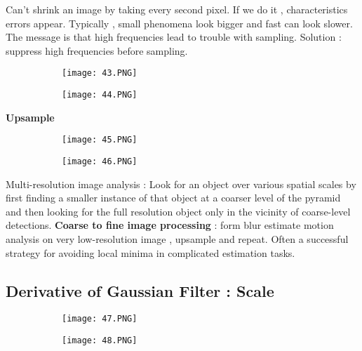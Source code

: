 \documentclass{article}
\begin{document}
Can't shrink an image by taking every second pixel. If we do it , characteristics errors appear.
Typically , small phenomena look bigger and fast can look slower.
The message is that high frequencies lead to trouble with sampling.
Solution : suppress high frequencies before sampling.


\begin{figure}[ht!]
  \centering
  \begin{subfigure}[b]{0.4\linewidth}
    \texttt{[image: 43.PNG]}
  \end{subfigure}
  \begin{subfigure}[b]{0.4\textwidth}
         \centering
         \texttt{[image: 44.PNG]}
     \end{subfigure}
\end{figure}


\textbf{Upsample}


\begin{figure}[ht!]
  \centering
  \begin{subfigure}[b]{0.4\linewidth}
    \texttt{[image: 45.PNG]}
  \end{subfigure}
  \begin{subfigure}[b]{0.4\textwidth}
         \centering
         \texttt{[image: 46.PNG]}
     \end{subfigure}
\end{figure}


Multi-resolution image analysis : Look for an object over various spatial scales by first finding a smaller instance of that object at a coarser level of the pyramid and then looking for the full resolution object only in the vicinity of coarse-level detections. \textbf{Coarse to fine image processing} : form blur estimate motion analysis on very low-resolution image , upsample and repeat. Often a successful strategy for avoiding local minima in complicated estimation tasks.

\subsection{Derivative of Gaussian Filter : Scale}

\begin{figure}[ht!]
  \centering
  \begin{subfigure}[b]{0.4\linewidth}
    \texttt{[image: 47.PNG]}
  \end{subfigure}
  \begin{subfigure}[b]{0.4\textwidth}
         \centering
         \texttt{[image: 48.PNG]}
     \end{subfigure}
\end{figure}
\end{document}
